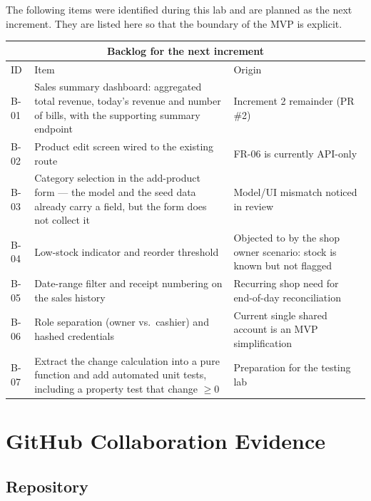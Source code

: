 \documentclass[11pt,a4paper]{article}
\newcommand{\code}[1]{\texttt{\small\color{codefg}\detokenize{#1}}}
\begin{document}
The following items were identified during this lab and are planned as the next increment.
They are listed here so that the boundary of the MVP is explicit.

\begin{table}[H]
\centering\small
\begin{tabularx}{\textwidth}{@{}p{}Xp{}@{}}
\toprule
\multicolumn{3}{c}{\sffamily\bfseries\color{navy} Backlog for the next increment}\\
\midrule
ID & Item & Origin\\
\hline
B-01 & Sales summary dashboard: aggregated total revenue, today's revenue and number of bills, with the supporting summary endpoint & Increment 2 remainder (PR \#2)\\
B-02 & Product edit screen wired to the existing \code{PUT /api/products/:id} route & FR-06 is currently API-only\\
B-03 & Category selection in the add-product form --- the \code{Product} model and the seed data already carry a \code{category} field, but the form does not collect it & Model/UI mismatch noticed in review\\
B-04 & Low-stock indicator and reorder threshold & Objected to by the shop owner scenario: stock is known but not flagged\\
B-05 & Date-range filter and receipt numbering on the sales history & Recurring shop need for end-of-day reconciliation\\
B-06 & Role separation (owner vs.\ cashier) and hashed credentials & Current single shared account is an MVP simplification\\
B-07 & Extract the change calculation into a pure function and add automated unit tests, including a property test that change $\ge 0$ & Preparation for the testing lab\\
\end{tabularx}
\end{table}

\section{GitHub Collaboration Evidence}
\label{sec:github}

\subsection{Repository}
\end{document}
